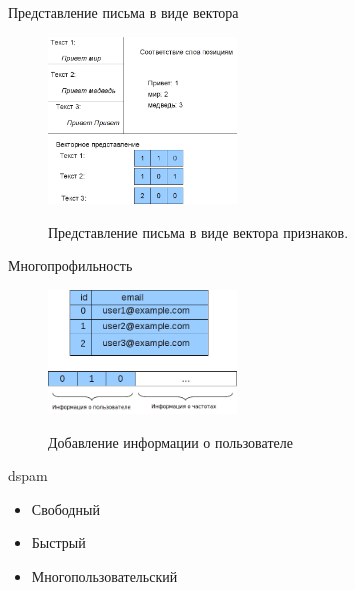 \documentclass{beamer}
\begin{document}
\begin{frame}{Представление письма в виде вектора}
\begin{figure}[h]
\begin{center}
    \includegraphics[width=5cm]{../img/vectorize}
\end{center}
    Представление письма в виде вектора признаков.
\end{figure}
\end{frame}

\begin{frame}{Многопрофильность}
\begin{figure}[h]
\begin{center}
    \includegraphics[width=5cm]{../img/add_uid}
\end{center}
	Добавление информации о пользователе
\end{figure}
\end{frame}



\begin{frame}{dspam}
    \begin{itemize}
        \item Свободный
        \item Быстрый
        \item Многопользовательский
    \end{itemize}
\end{frame}
\end{document}
